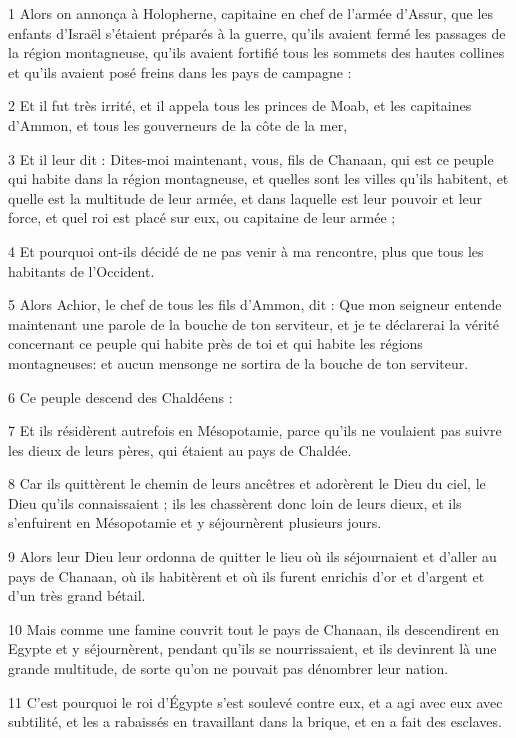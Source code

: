 \par 1 Alors on annonça à Holopherne, capitaine en chef de l'armée d'Assur, que les enfants d'Israël s'étaient préparés à la guerre, qu'ils avaient fermé les passages de la région montagneuse, qu'ils avaient fortifié tous les sommets des hautes collines et qu'ils avaient posé freins dans les pays de campagne :
\par 2 Et il fut très irrité, et il appela tous les princes de Moab, et les capitaines d'Ammon, et tous les gouverneurs de la côte de la mer,
\par 3 Et il leur dit : Dites-moi maintenant, vous, fils de Chanaan, qui est ce peuple qui habite dans la région montagneuse, et quelles sont les villes qu'ils habitent, et quelle est la multitude de leur armée, et dans laquelle est leur pouvoir et leur force, et quel roi est placé sur eux, ou capitaine de leur armée ;
\par 4 Et pourquoi ont-ils décidé de ne pas venir à ma rencontre, plus que tous les habitants de l'Occident.
\par 5 Alors Achior, le chef de tous les fils d'Ammon, dit : Que mon seigneur entende maintenant une parole de la bouche de ton serviteur, et je te déclarerai la vérité concernant ce peuple qui habite près de toi et qui habite les régions montagneuses: et aucun mensonge ne sortira de la bouche de ton serviteur.
\par 6 Ce peuple descend des Chaldéens :
\par 7 Et ils résidèrent autrefois en Mésopotamie, parce qu'ils ne voulaient pas suivre les dieux de leurs pères, qui étaient au pays de Chaldée.
\par 8 Car ils quittèrent le chemin de leurs ancêtres et adorèrent le Dieu du ciel, le Dieu qu'ils connaissaient ; ils les chassèrent donc loin de leurs dieux, et ils s'enfuirent en Mésopotamie et y séjournèrent plusieurs jours.
\par 9 Alors leur Dieu leur ordonna de quitter le lieu où ils séjournaient et d'aller au pays de Chanaan, où ils habitèrent et où ils furent enrichis d'or et d'argent et d'un très grand bétail.
\par 10 Mais comme une famine couvrit tout le pays de Chanaan, ils descendirent en Egypte et y séjournèrent, pendant qu'ils se nourrissaient, et ils devinrent là une grande multitude, de sorte qu'on ne pouvait pas dénombrer leur nation.
\par 11 C'est pourquoi le roi d'Égypte s'est soulevé contre eux, et a agi avec eux avec subtilité, et les a rabaissés en travaillant dans la brique, et en a fait des esclaves.
